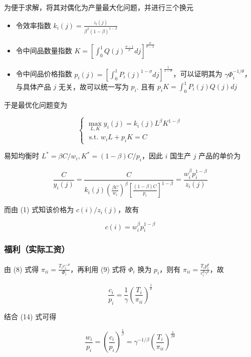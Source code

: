\documentclass[
]{article}
\providecommand{\tightlist}{%
  \setlength{\itemsep}{0pt}\setlength{\parskip}{0pt}}
\begin{document}
为便于求解，将其对偶化为产量最大化问题，并进行三个换元

\begin{itemize}
\tightlist
\item
  令效率指数 \(k_{i}(j)=\frac{z_{i}(j)}{\beta^{\beta}(1-\beta)^{1-\beta}}\)
\item
  令中间品数量指数
  \(K=\left[\int_{0}^{1} Q(j)^{\frac{\sigma-1}{\sigma}} d j\right]^{\frac{\sigma}{\sigma-1}}\)
\item
  令中间品价格指数
  \(p_{i}(j)=\left[\int_{0}^{1} P_{i}(j)^{1-\sigma} d j\right]^{\frac{1}{1-\sigma}}\)，可以证明其为
  \(\gamma \Phi_{i}^{-1 / \theta}\)，与具体产品 \(j\) 无关，故可以统一写为
  \(p_{i}\). 且有 \(p_{i}K=\int_{0}^{1} P_{i}(j)Q(j) d j\)
\end{itemize}

于是最优化问题变为

\[
\left\{\begin{array}{c}
{\max_{L, K} y_{i}(j)=k_{i}(j)L^{\beta}K^{1-\beta}} \\ {\text { s.t. } w_{i}L + p_{i}K = C}
\end{array}\right.
\]

易知均衡时 \(L^*=\beta C/w_i, K^*=(1-\beta)C/p_i\)，因此 \(i\) 国生产 \(j\)
产品的单价为

\[\frac{C}{y_{i}(j)}=\frac{C}{k_i(j)\left(\frac{\beta C}{w_i}\right)^\beta\left[\frac{(1-\beta) C}{p_i}\right]^{1-\beta}}=\frac{w_{i}^{\beta}p_{i}^{1-\beta}}{z_{i}(j)}\]

而由 (1) 式知该价格为 \(c(i)/{z_{i}(j)}\)，故有

\[
c(i)=w_{i}^{\beta}p_{i}^{1-\beta} \tag{14}
\]

\hypertarget{ux798fux5229ux5b9eux9645ux5de5ux8d44}{%
\subsubsection{福利（实际工资）}\label{ux798fux5229ux5b9eux9645ux5de5ux8d44}}

由 (8) 式得 \(\pi_{ii}=\frac{T_{i}c_{i}^{-\theta}}{\Phi_{i}}\)，再利用 (9) 式将 \(\Phi_{i}\) 换为 \(p_{i}\)，则有
\(\pi_{ii}=\frac{T_{i}p_{i}^{\theta}}{c_{i}^{\theta}\gamma^{\theta}}\)，故

\[\frac{c_i}{p_i}=\frac{1}{\gamma}\left(\frac{T_i}{\pi_{ii}}\right)^{\frac{1}{\theta}}\]

结合 (14) 式可得

\[
\frac{w_i}{p_i}=\left(\frac{c_i}{p_{i}}\right)^{\frac{1}{\beta}}=\gamma^{-1/\beta}\left(\frac{T_i}{\pi_{ii}}\right)^{\frac{1}{\beta\theta}} \tag{15}
\]
\end{document}

